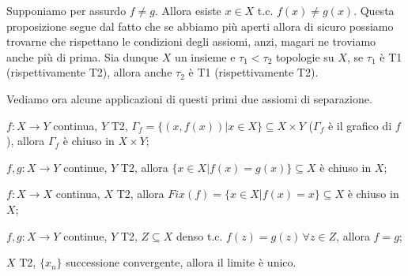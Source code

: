 \begin{prop}Supponiamo per assurdo $f \not=g$. Allora esiste $x \in X$ t.c. $f(x) \not= g(x)$.
  Questa proposizione segue dal fatto che se abbiamo più aperti allora di sicuro possiamo trovarne che rispettano le condizioni degli assiomi, anzi, magari ne troviamo anche più di prima. Sia dunque $X$ un insieme e $\tau_1< \tau_2$ topologie su $X$, se $\tau_1$ è T1 (rispettivamente T2), allora anche $\tau_2$ è T1 (rispettivamente T2).
\end{prop}

Vediamo ora alcune applicazioni di questi primi due assiomi di separazione.

\begin{nlist}
  \item $f: X \rightarrow Y$ continua, $Y$ T2, $\Gamma_f=\{ (x, f(x)) | x \in X\} \subseteq X \times Y$ ($\Gamma_f$ è il grafico di $f$), allora $\Gamma_f$ è chiuso in $X \times Y$;
  \item $f, g: X \rightarrow Y$ continue, $Y$ T2, allora $\{ x \in X | f(x)=g(x) \} \subseteq X$ è chiuso in $X$;
  \item $f:X \rightarrow X$ continua, $X$ T2, allora $Fix(f) = \{ x \in X | f(x)=x \} \subseteq X$ è chiuso in $X$;
  \item $f, g:X \rightarrow Y$ continue, $Y$ T2, $Z \subseteq X$ denso t.c. $f(z)=g(z) \, \forall z \in Z$, allora $f=g$;
  \item $X$ T2, $\{x_n\}$ successione convergente, allora il limite è unico.
\end{nlist}

